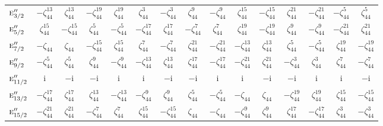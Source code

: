 \documentclass[10pt,a4paper]{article}
\numberwithin{equation}{section}
\newcommand{\irr}[1]{\text{\normalfont\scshape #1}}
\newcommand{\iunit}{\mathrm{i}}
\newcommand{\rootunity}[1]{\zeta_{#1}}
\begin{document}
{\begin{longtable}{@{}lcccccccccccccc@{}}
$\irr{e}_{3/2}''$ & $-\rootunity{44}^{13}$ & $\rootunity{44}^{13}$ & $-\rootunity{44}^{19}$ & $\rootunity{44}^{19}$ & $\rootunity{44}^{3}$ & $-\rootunity{44}^{3}$ & $\rootunity{44}^{9}$ & $-\rootunity{44}^{9}$ & $\rootunity{44}^{15}$ & $-\rootunity{44}^{15}$ & $\rootunity{44}^{21}$ & $-\rootunity{44}^{21}$ & $-\rootunity{44}^{5}$ & $\rootunity{44}^{5}$\\
$\irr{e}_{5/2}''$ & $\rootunity{44}^{15}$ & $-\rootunity{44}^{15}$ & $\rootunity{44}^{5}$ & $-\rootunity{44}^{5}$ & $-\rootunity{44}^{17}$ & $\rootunity{44}^{17}$ & $-\rootunity{44}^{7}$ & $\rootunity{44}^{7}$ & $\rootunity{44}^{19}$ & $-\rootunity{44}^{19}$ & $\rootunity{44}^{9}$ & $-\rootunity{44}^{9}$ & $-\rootunity{44}^{21}$ & $\rootunity{44}^{21}$\\
$\irr{e}_{7/2}''$ & $-\rootunity{44}$ & $\rootunity{44}$ & $-\rootunity{44}^{15}$ & $\rootunity{44}^{15}$ & $\rootunity{44}^{7}$ & $-\rootunity{44}^{7}$ & $\rootunity{44}^{21}$ & $-\rootunity{44}^{21}$ & $-\rootunity{44}^{13}$ & $\rootunity{44}^{13}$ & $\rootunity{44}^{5}$ & $-\rootunity{44}^{5}$ & $\rootunity{44}^{19}$ & $-\rootunity{44}^{19}$\\
$\irr{e}_{9/2}''$ & $-\rootunity{44}^{5}$ & $\rootunity{44}^{5}$ & $\rootunity{44}^{9}$ & $-\rootunity{44}^{9}$ & $-\rootunity{44}^{13}$ & $\rootunity{44}^{13}$ & $\rootunity{44}^{17}$ & $-\rootunity{44}^{17}$ & $-\rootunity{44}^{21}$ & $\rootunity{44}^{21}$ & $-\rootunity{44}^{3}$ & $\rootunity{44}^{3}$ & $\rootunity{44}^{7}$ & $-\rootunity{44}^{7}$\\
$\irr{e}_{11/2}''$ & $\iunit{}$ & $-\iunit{}$ & $-\iunit{}$ & $\iunit{}$ & $\iunit{}$ & $-\iunit{}$ & $-\iunit{}$ & $\iunit{}$ & $\iunit{}$ & $-\iunit{}$ & $-\iunit{}$ & $\iunit{}$ & $\iunit{}$ & $-\iunit{}$\\
$\irr{e}_{13/2}''$ & $-\rootunity{44}^{17}$ & $\rootunity{44}^{17}$ & $\rootunity{44}^{13}$ & $-\rootunity{44}^{13}$ & $-\rootunity{44}^{9}$ & $\rootunity{44}^{9}$ & $\rootunity{44}^{5}$ & $-\rootunity{44}^{5}$ & $-\rootunity{44}$ & $\rootunity{44}$ & $-\rootunity{44}^{19}$ & $\rootunity{44}^{19}$ & $\rootunity{44}^{15}$ & $-\rootunity{44}^{15}$\\
$\irr{e}_{15/2}''$ & $-\rootunity{44}^{21}$ & $\rootunity{44}^{21}$ & $-\rootunity{44}^{7}$ & $\rootunity{44}^{7}$ & $\rootunity{44}^{15}$ & $-\rootunity{44}^{15}$ & $\rootunity{44}$ & $-\rootunity{44}$ & $-\rootunity{44}^{9}$ & $\rootunity{44}^{9}$ & $\rootunity{44}^{17}$ & $-\rootunity{44}^{17}$ & $\rootunity{44}^{3}$ & $-\rootunity{44}^{3}$\\

\end{longtable}}
\end{document}
